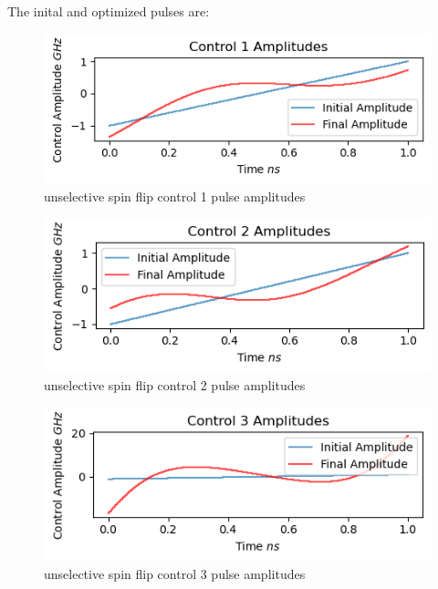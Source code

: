 \documentclass[12pt]{article}
\begin{document}
The inital and optimized pulses are: 
\begin{figure}[H]
    \centering
    \includegraphics[width=0.95\linewidth]{unselective_spin_flip_control1.png}
    \caption{unselective spin flip control 1 pulse amplitudes}
    \label{fig:unselective_spin_flip_control1}
\end{figure}
\begin{figure}[H]
    \centering
    \includegraphics[width=0.95\linewidth]{unselective_spin_flip_control2.png}
    \caption{unselective spin flip control 2 pulse amplitudes}
    \label{fig:unselective_spin_flip_control2}
\end{figure}
\begin{figure}[H]
    \centering
    \includegraphics[width=0.95\linewidth]{unselective_spin_flip_control3.png}
    \caption{unselective spin flip control 3 pulse amplitudes}
    \label{fig:unselective_spin_flip_control3}
\end{figure}
\end{document}
